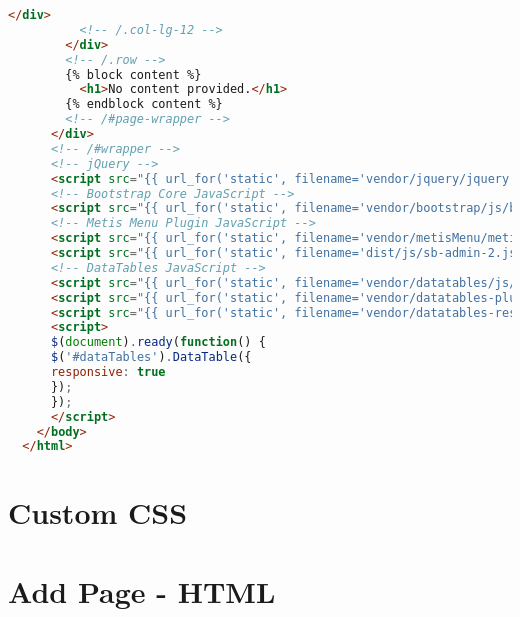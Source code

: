 \begin{lstlisting}[language=HTML]
          </div>
          <!-- /.col-lg-12 -->
        </div>
        <!-- /.row -->
        {% block content %}
          <h1>No content provided.</h1>
        {% endblock content %}
        <!-- /#page-wrapper -->
      </div>
      <!-- /#wrapper -->
      <!-- jQuery -->
      <script src="{{ url_for('static', filename='vendor/jquery/jquery.min.js') }}"></script>
      <!-- Bootstrap Core JavaScript -->
      <script src="{{ url_for('static', filename='vendor/bootstrap/js/bootstrap.min.js') }}"></script>
      <!-- Metis Menu Plugin JavaScript -->
      <script src="{{ url_for('static', filename='vendor/metisMenu/metisMenu.min.js') }}"></script>
      <script src="{{ url_for('static', filename='dist/js/sb-admin-2.js') }}"></script>
      <!-- DataTables JavaScript -->
      <script src="{{ url_for('static', filename='vendor/datatables/js/jquery.dataTables.min.js') }}"></script>
      <script src="{{ url_for('static', filename='vendor/datatables-plugins/dataTables.bootstrap.min.js') }}"></script>
      <script src="{{ url_for('static', filename='vendor/datatables-responsive/dataTables.responsive.js') }}"></script>
      <script>
      $(document).ready(function() {
      $('#dataTables').DataTable({
      responsive: true
      });
      });
      </script>
    </body>
  </html>
\end{lstlisting}

\pagebreak

\section{Custom CSS}
\pagebreak

\section{Add Page - HTML}
\begin{lstlisting}[language=HTML]
\end{lstlisting}
\pagebreak

